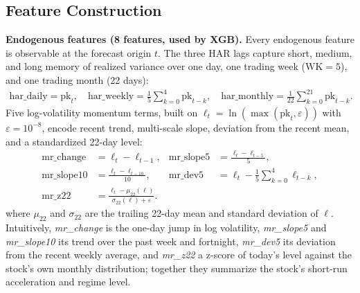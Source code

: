 \documentclass[runningheads]{llncs}
\begin{document}
\subsection{Feature Construction}
\textbf{Endogenous features (8 features, used by XGB).} Every endogenous feature is observable at the
forecast origin $t$. The three HAR lags capture short, medium, and long memory of realized variance
over one day, one trading week ($\mathrm{WK}=5$), and one trading month (22 days):
\begin{align}
\mathrm{har\_daily} = \mathrm{pk}_t, \quad
\mathrm{har\_weekly} = \frac{1}{5}\sum_{k=0}^{4}\mathrm{pk}_{t-k}, \quad
\mathrm{har\_monthly} = \frac{1}{22}\sum_{k=0}^{21}\mathrm{pk}_{t-k}.
\end{align}
Five log-volatility momentum terms, built on $\ell_t=\ln(\max(\mathrm{pk}_t,\varepsilon))$ with
$\varepsilon=10^{-8}$, encode recent trend, multi-scale slope, deviation from the recent mean, and a
standardized 22-day level:
\begin{align}
\mathrm{mr\_change} &= \ell_t-\ell_{t-1}, &
\mathrm{mr\_slope5} &= \frac{\ell_t-\ell_{t-5}}{5},\\
\mathrm{mr\_slope10} &= \frac{\ell_t-\ell_{t-10}}{10}, &
\mathrm{mr\_dev5} &= \ell_t-\frac{1}{5}\sum_{k=0}^{4}\ell_{t-k},\\
\mathrm{mr\_z22} &= \frac{\ell_t-\mu_{22}(\ell)}{\sigma_{22}(\ell)+\varepsilon}. &&
\end{align}
where $\mu_{22}$ and $\sigma_{22}$ are the trailing 22-day mean and standard deviation of $\ell$.
Intuitively, \emph{mr\_change} is the one-day jump in log volatility, \emph{mr\_slope5} and
\emph{mr\_slope10} its trend over the past week and fortnight, \emph{mr\_dev5} its deviation from the
recent weekly average, and \emph{mr\_z22} a z-score of today's level against the stock's own monthly
distribution; together they summarize the stock's short-run acceleration and regime level.
\end{document}
